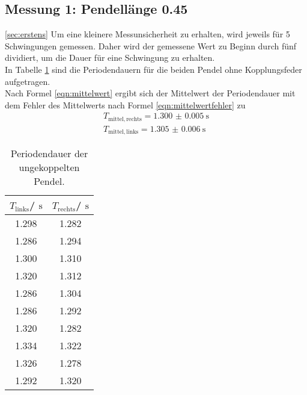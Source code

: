 \subsection{Messung 1: Pendellänge 0.45}
\ref{sec:erstens}
Um eine kleinere Messunsicherheit zu erhalten, wird jeweils für 5 Schwingungen gemessen. Daher wird der gemessene Wert zu Beginn durch fünf dividiert, um die Dauer für eine Schwingung zu erhalten.
\\In Tabelle \ref{tab:alinksrechts} sind die Periodendauern für die beiden Pendel ohne Kopplungsfeder aufgetragen.
\\Nach Formel \eqref{eqn:mittelwert} ergibt sich der Mittelwert der Periodendauer mit dem Fehler des Mittelwerts nach Formel \eqref{eqn:mittelwertfehler} zu
\begin{gather*}
	T_{\mathrm{mittel, rechts}}=\SI{1.300(5)}{\second}\\
	T_{\mathrm{mittel, links}}=\SI{1.305(6)}{\second}
\end{gather*}
\begin{table}
	\centering
	\caption{Periodendauer der ungekoppelten Pendel.}
	\label{tab:alinksrechts}
	\begin{tabular}{cc}
		\toprule
		$T_{\mathrm{links}}$/ $\si{\second}$ & $T_{\mathrm{rechts}}$/ $\si{\second}$ \\
		\midrule
		1.298                                & 1.282                                 \\
		1.286                                & 1.294                                 \\
		1.300                                & 1.310                                 \\
		1.320                                & 1.312                                 \\
		1.286                                & 1.304                                 \\
		1.286                                & 1.292                                 \\
		1.320                                & 1.282                                 \\
		1.334                                & 1.322                                 \\
		1.326                                & 1.278                                 \\
		1.292                                & 1.320                                 \\
		\bottomrule
	\end{tabular}
\end{table}


